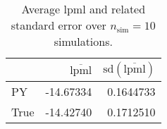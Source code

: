 \begin{table}[H]

\caption{Average lpml and related standard error over $n_{\text{sim}} = 10$ simulations.}
\centering
\begin{tabular}[t]{lrr}
\toprule
  & $\overbar{\text{lpml}}$ & $\text{sd}(\overbar{\text{lpml}})$\\
\midrule
PY & -14.67334 & 0.1644733\\
True & -14.42740 & 0.1712510\\
\bottomrule
\end{tabular}
\end{table}